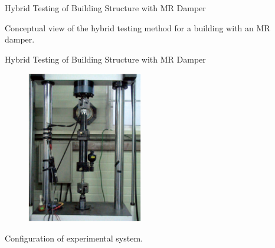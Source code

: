 \documentclass[usepdftitle=false]{beamer}
\begin{document}
\begin{frame}{Hybrid Testing of Building Structure with MR Damper}
\begin{figure}[!ht]
\centering
\setcounter{subfigure}{0}
\label{fig:8-1}
\end{figure}
Conceptual view of the hybrid testing method for a building with an MR damper.
\end{frame}

\begin{frame}{Hybrid Testing of Building Structure with MR Damper}
\begin{figure}[!ht]
\centering
\includegraphics[width=0.45\textwidth] {figure/8-2.eps}
\label{fig:8-2}
\end{figure}
Configuration of experimental system.
\end{frame}
\end{document}

